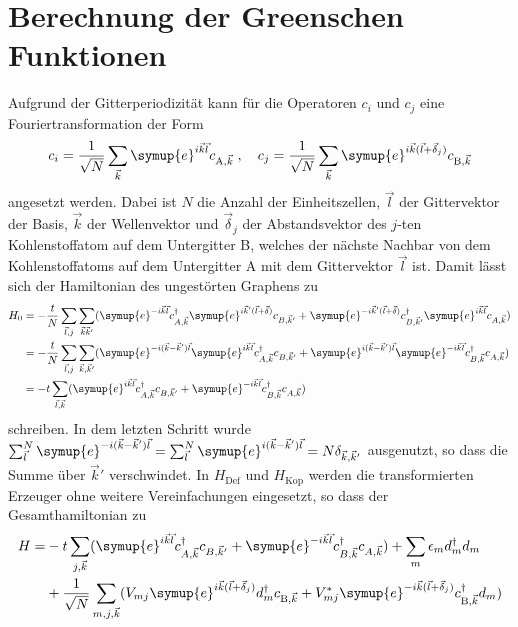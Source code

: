 \section{Berechnung der Greenschen Funktionen}
\label{sec:calc_greensfunction}
Aufgrund der Gitterperiodizität kann für die Operatoren $c_i$ und $c_j$ eine Fouriertransformation der Form 
\begin{equation}
    c_i = \frac{1}{\sqrt{N}} \sum_{\vec{k}} \symup{e}^{i\vec{k}\vec{l}} c_{\text{A}, \vec{k}} \; , 
    \quad c_j = \frac{1}{\sqrt{N}} \sum_{\vec{k}} \symup{e}^{i\vec{k}(\vec{l}+\vec{\delta}_j)} c_{\text{B}, \vec{k}} \label{eqn:fourier_ladder}
\end{equation}
angesetzt werden.
Dabei ist $N$ die Anzahl der Einheitszellen, $\vec{l}$ der Gittervektor der Basis, $\vec{k}$ der Wellenvektor und $\vec{\delta}_j$ der Abstandsvektor
des $j$-ten Kohlenstoffatom auf dem Untergitter B, welches der nächste Nachbar von dem Kohlenstoffatoms auf dem Untergitter A mit dem Gittervektor $\vec{l}$ ist.
Damit lässt sich der Hamiltonian des ungestörten Graphens zu 
\begin{align*}
    H_0 &= -\frac{t}{N} \sum_{\vec{l}, j} \sum_{\vec{k}\vec{k}'} ( \symup{e}^{-i\vec{k}\vec{l}}c^\dagger_{A,\vec{k}} 
    \symup{e}^{i\vec{k}'(\vec{l}+\vec{\delta})}c_{B,\vec{k}'} + \symup{e}^{-i\vec{k}'(\vec{l}+\vec{\delta})} c^\dagger_{B,\vec{k}'} 
    \symup{e}^{i\vec{k}\vec{l}}c_{A,\vec{k}}) \\
    &= -\frac{t}{N} \sum_{\vec{l}, j} \sum_{\vec{k},\vec{k}'} ( \symup{e}^{-i(\vec{k}- \vec{k}')\vec{l}}\symup{e}^{i\vec{k}\vec{l}}c^\dagger_{A,\vec{k}} c_{B,\vec{k}'} + 
    \symup{e}^{i(\vec{k}- \vec{k}')\vec{l}} \symup{e}^{-i\vec{k}\vec{l}} c^\dagger_{B,\vec{k}}c_{A,\vec{k}}) \\
    &= -t \sum_{\vec{l}, \vec{k}} ( \symup{e}^{i\vec{k}\vec{l}}c^\dagger_{A,\vec{k}} c_{B,\vec{k}'} + 
    \symup{e}^{-i\vec{k}\vec{l}} c^\dagger_{B,\vec{k}}c_{A,\vec{k}})
\end{align*}
schreiben.
In dem letzten Schritt wurde $\sum_{\vec{l}}^N \symup{e}^{-i(\vec{k}- \vec{k}')\vec{l}} 
= \sum_{\vec{l}}^N \symup{e}^{i(\vec{k}- \vec{k}')\vec{l}} = N\delta_{\vec{k}, \vec{k}'}$ ausgenutzt, so dass die Summe über $\vec{k}'$ verschwindet.
In $H_\text{Def}$ und $H_\text{Kop}$ werden die transformierten Erzeuger ohne weitere Vereinfachungen eingesetzt,  so dass der Gesamthamiltonian zu 
\begin{equation}
    \begin{split}
        H = &-t \sum_{j, \vec{k}} ( \symup{e}^{i\vec{k}\vec{l}}c^\dagger_{A,\vec{k}} c_{B,\vec{k}'} + 
            \symup{e}^{-i\vec{k}\vec{l}} c^\dagger_{B,\vec{k}}c_{A,\vec{k}}) + \sum_m \epsilon_m d_m^\dagger d_m \\
            &+ \frac{1}{\sqrt{N}}\sum_{m,j,\vec{k}} ( V_{mj}  \symup{e}^{i\vec{k}(\vec{l}+\vec{\delta}_j)} d_m^\dagger c_{\text{B},\vec{k}} 
            + V^*_{mj} \symup{e}^{-i\vec{k}(\vec{l}+\vec{\delta}_j)}c^\dagger_{\text{B},\vec{k}} d_m )
    \end{split}
    \end{equation}
